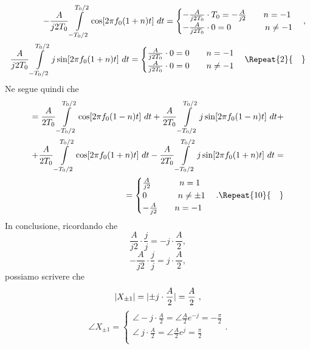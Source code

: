 \documentclass[12pt,oneside,openany]{memoir}
\numberwithin{equation}{subsection}
\DeclarePairedDelimiter{\abs}{\lvert}{\rvert}
\newcommand{\quads}[1]{\Repeat{#1}{\quad}}
\newcommand{\dt}{\ dt}
\begin{document}
\begin{equation}
	\begin{split}
		-\frac{A}{j 2 T_0} \int\displaylimits_{-T_0/2}^{T_0/2} \cos[2 \pi f_0 (1 + n) t] \dt =
			\begin{cases}
				-\frac{A}{j 2 T_0} \cdot T_0 = -\frac{A}{j 2} \quad\quad n = -1\\
				-\frac{A}{j 2 T_0} \cdot 0 = 0 \quad\quad \ \ \ \ \ \ n \neq -1
			\end{cases},
		\\
		\frac{A}{j 2 T_0} \int\displaylimits_{-T_0/2}^{T_0/2} j \sin[2 \pi f_0 (1 + n) t] \dt =
			\begin{cases}
				\frac{A}{j 2 T_0} \cdot 0 = 0 \quad\quad n = -1\\
				\frac{A}{j 2 T_0} \cdot 0 = 0 \quad\quad n \neq -1
			\end{cases}
			\quads{2}
	\end{split}
\end{equation}
Ne segue quindi che
\begin{equation}
	\begin{split}
		= \frac{A}{2 T_0} \int\displaylimits_{-T_0/2}^{T_0/2} \cos[2 \pi f_0 (1 - n) t] \dt + \frac{A}{2 T_0} \int\displaylimits_{-T_0/2}^{T_0/2} j \sin[2 \pi f_0 (1 - n) t] \dt +
		\\
		+ \frac{A}{2 T_0} \int\displaylimits_{-T_0/2}^{T_0/2} \cos[2 \pi f_0 (1 + n) t] \dt - \frac{A}{2 T_0} \int\displaylimits_{-T_0/2}^{T_0/2} j \sin[2 \pi f_0 (1 + n) t] \dt =
		\\
		=
		\begin{cases}
			\frac{A}{j 2} \quad\quad \ \ \ \ n = 1\\
			0 \quad\quad \ \ \ \ \ n \neq \pm 1\\
			-\frac{A}{j 2} \quad\quad n = -1
		\end{cases}.
		\quads{10}
	\end{split}
\end{equation}
In conclusione, ricordando che
\[
\frac{A}{j 2} \cdot \frac{j}{j} = -j \cdot \frac{A}{2},
\]
\[
-\frac{A}{j 2} \cdot \frac{j}{j} = j \cdot \frac{A}{2},
\]
possiamo scrivere che
\begin{equation}
	\abs{X_{\pm 1}} = \abs{\pm j \cdot \frac{A}{2}} = \frac{A}{2} \ ,
\end{equation}
\begin{equation}
	\angle X_{\pm 1} =
		\begin{cases}
			\angle -j \cdot \frac{A}{2} = \angle \frac{A}{2} e^{-j} = -\frac{\pi}{2}\\
			\angle \ j \cdot \frac{A}{2} = \angle \frac{A}{2} e^{j} = \frac{\pi}{2}\\
		\end{cases}.
\end{equation}
\end{document}
